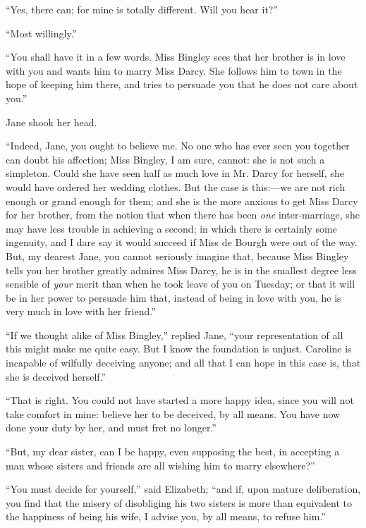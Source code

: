 \documentclass[12pt]{book}
\begin{document}
``Yes, there can; for mine is totally different. Will you hear it?''

``Most willingly.''

``You shall have it in a few words. Miss Bingley sees that her brother is in love with you and wants him to marry Miss Darcy. She follows him to town in the hope of keeping him there, and tries to persuade you that he does not care about you.''

Jane shook her head.

``Indeed, Jane, you ought to believe me. No one who has ever seen you together can doubt his affection; Miss Bingley, I am sure, cannot: she is not such a simpleton. Could she have seen half as much love in Mr. Darcy for herself, she would have ordered her wedding clothes. But the case is this:---we are not rich enough or grand enough for them; and she is the more anxious to get Miss Darcy for her brother, from the notion that when there has been \textit{one} inter-marriage, she may have less trouble in achieving a second; in which there is certainly some ingenuity, and I dare say it would succeed if Miss de Bourgh were out of the way. But, my dearest Jane, you cannot seriously imagine that, because Miss Bingley tells you her brother greatly admires Miss Darcy, he is in the smallest degree less sensible of \textit{your} merit than when he took leave of you on Tuesday; or that it will be in her power to persuade him that, instead of being in love with you, he is very much in love with her friend.''

``If we thought alike of Miss Bingley,'' replied Jane, ``your representation of all this might make me quite easy. But I know the foundation is unjust. Caroline is incapable of wilfully deceiving anyone; and all that I can hope in this case is, that she is deceived herself.''

``That is right. You could not have started a more happy idea, since you will not take comfort in mine: believe her to be deceived, by all means. You have now done your duty by her, and must fret no longer.''

``But, my dear sister, can I be happy, even supposing the best, in accepting a man whose sisters and friends are all wishing him to marry elsewhere?''

``You must decide for yourself,'' said Elizabeth; ``and if, upon mature deliberation, you find that the misery of disobliging his two sisters is more than equivalent to the happiness of being his wife, I advise you, by all means, to refuse him.''
\end{document}
